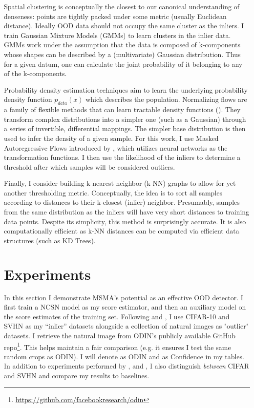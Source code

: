 Spatial clustering is conceptually the closest to our canonical understanding of denseness: points are tightly packed under some metric (usually Euclidean distance). Ideally OOD data should not occupy the same cluster as the inliers. I train Gaussian Mixture Models (GMMs) to learn clusters in the inlier data. GMMs work under the assumption that the data is composed of k-components whose shapes can be described by a (multivariate) Gaussian distribution. Thus for a given datum, one can calculate the joint probability of it belonging to any of the k-components.

Probability density estimation techniques aim to learn the underlying probability density function $p_{data} (x)$ which describes the population. Normalizing flows are a family of flexible methods that can learn tractable density functions (\cite{Papamakarios2019}). They transform complex distributions into a simpler one (such as a Gaussian) through a series of invertible, differential mappings. The simpler base distribution is then used to infer the density of a given sample. For this work, I use Masked Autoregressive Flows introduced by \cite{Papamakarios2017masked}, which utilizes neural networks as the transformation functions. I then use the likelihood of the inliers to determine a threshold after which samples will be considered outliers.

Finally, I consider building k-nearest neighbor (k-NN) graphs to allow for yet another thresholding metric. Conceptually, the idea is to sort all samples according to distances to their k-closest (inlier) neighbor. Presumably, samples from the same distribution as the inliers will have very short distances to training data points. Despite its simplicity, this method is surprisingly accurate. It is also computationally efficient as k-NN distances can be computed via efficient data structures (such as KD Trees).


\section{Experiments}
\label{experiments}

In this section I demonstrate MSMA's potential as an effective OOD detector. I first train a NCSN model as my score estimator, and then an auxiliary model on the score estimates of the training set. Following \cite{Liang2017} and \cite{Devries}, I use CIFAR-10 and SVHN as my “inlier” datasets alongside a collection of natural images as "outlier" datasets. I retrieve the natural image from ODIN's publicly available GitHub repo\footnote{\url{https://github.com/facebookresearch/odin}}. This helps maintain a fair comparison (e.g. it ensures I test the same random crops as ODIN). I will denote \cite{Liang2017} as ODIN and \cite{Devries} as Confidence in my tables.
In addition to experiments performed by \cite{Hendrycks2019}, \cite{Liang2017} and \cite{Devries}, I also distinguish \textit{between} CIFAR and SVHN and compare my results to baselines.

